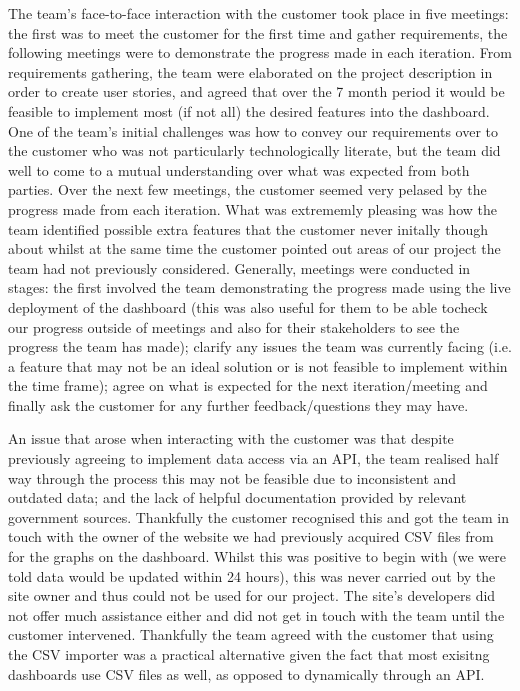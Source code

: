 \documentclass{l3proj}
\begin{document}
The team's face-to-face interaction with the customer took place in five meetings: the first was to meet the customer
for the first time and gather requirements, the following meetings were to demonstrate the progress made in each
iteration. From requirements gathering, the team were elaborated on the project description in order to create user stories,
and agreed that over the 7 month period it would be feasible to implement most (if not all) the desired features into the
dashboard. One of the team's initial challenges was how to convey our requirements over to the customer who was not particularly
technologically literate, but the team did well to come to a mutual understanding over what was expected from both parties.
Over the next few meetings, the customer seemed very pelased by the progress made from each iteration. What was extrememly
pleasing was how the team identified possible extra features that the customer never initally though about whilst at the
same time the customer pointed out areas of our project the team had not previously considered. Generally, meetings
were conducted in stages: the first involved the team demonstrating the progress made using the live deployment of the
dashboard (this was also useful for them to be able tocheck our progress outside of meetings and also for their
stakeholders to see the progress the team has made); clarify any issues the team was currently facing (i.e. a feature
that may not be an ideal solution or is not feasible to implement within the time frame); agree on what is expected
for the next iteration/meeting and finally ask the customer for any further feedback/questions they may have.

An issue that arose when interacting with the customer was that despite previously agreeing to implement data access
via an API, the team realised half way through the process this may not be feasible due to inconsistent and outdated
data; and the lack of helpful documentation provided by relevant government sources. Thankfully the customer recognised
this and got the team in touch with the owner of the website we had previously acquired CSV files from for the graphs on
the dashboard. Whilst this was positive to begin with (we were told data would be updated within 24 hours), this was
never carried out by the site owner and thus could not be used for our project. The site's developers did not offer much
assistance either and did not get in touch with the team until the customer intervened. Thankfully the team agreed with
the customer that using the CSV importer was a practical alternative given the fact that most exisitng dashboards use
CSV files as well, as opposed to dynamically through an API.
\end{document}
